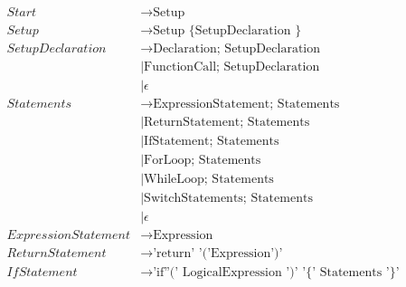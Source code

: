 \begin{align*}
    Start                       & \to \text{Setup}                                                                              \\
    Setup                       & \to \text{Setup \{ SetupDeclaration \}}                                                       \\
    SetupDeclaration            & \to \text{Declaration; SetupDeclaration}                                                      \\
                                & \mid \text{FunctionCall; SetupDeclaration}                                                    \\ 
                                & \mid \epsilon                                                                                 \\
    Statements                  & \to \text{ExpressionStatement; Statements}                                                    \\
                                & \mid \text{ReturnStatement; Statements}                                                       \\
                                & \mid \text{IfStatement; Statements}                                                           \\
                                & \mid \text{ForLoop; Statements}                                                               \\
                                & \mid \text{WhileLoop; Statements}                                                             \\
                                & \mid \text{SwitchStatements; Statements}                                                      \\
                                & \mid \epsilon                                                                                 \\
    ExpressionStatement         & \to \text{Expression}                                                                         \\
    ReturnStatement             & \to \text{'return' '('Expression')'}                                                          \\
    IfStatement                 & \to \text{'if''(' LogicalExpression ')' '\{' Statements '\}' ElseStatement}                   \\

\end{align*}
